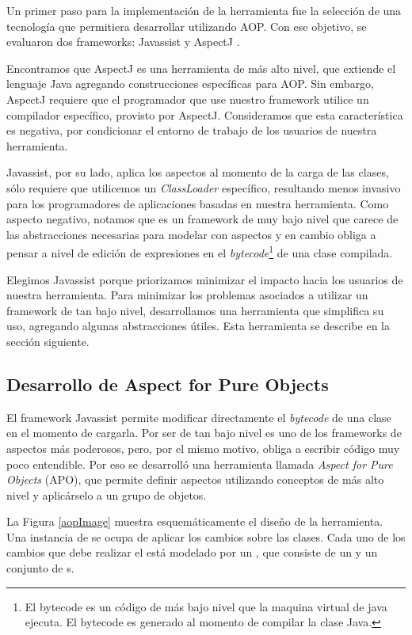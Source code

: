 Un primer paso para la implementación de la herramienta fue la selección de una
tecnología que permitiera desarrollar utilizando AOP.
Con ese objetivo, se evaluaron dos frameworks: Javassist
\cite{chiba00loadtime} y AspectJ \cite{KiczalesHHKPG01}.

\medskip 
Encontramos que AspectJ es una herramienta de más alto nivel, que extiende
el lenguaje Java agregando construcciones específicas para AOP.
Sin embargo, AspectJ requiere que el programador que use nuestro framework
utilice un compilador específico, provisto por AspectJ. 
Consideramos que esta característica es negativa, por condicionar el
entorno de trabajo de los usuarios de nuestra herramienta.

Javassist, por su lado, aplica los aspectos al momento de
la carga de las clases, sólo requiere que utilicemos un \emph{ClassLoader}
específico, resultando menos invasivo para los programadores de aplicaciones
basadas en nuestra herramienta.
Como aspecto negativo, notamos que es un framework de muy bajo nivel que
carece de las abstracciones necesarias para modelar con aspectos y en cambio
obliga a pensar a nivel de edición de expresiones en el \emph{bytecode}\footnote{
El bytecode es un código de más bajo nivel que la maquina virtual de java ejecuta. El bytecode es generado al
momento de compilar la clase Java.} 
	de una clase compilada.
	
	Elegimos Javassist porque priorizamos minimizar el impacto hacia los usuarios
	de nuestra herramienta.
	Para minimizar los problemas asociados a utilizar un framework de tan bajo
	nivel, desarrollamos una herramienta que simplifica su uso, agregando algunas
	abstracciones útiles. Esta herramienta se describe en la sección siguiente.

\subsection{Desarrollo de Aspect for Pure Objects}
El framework Javassist permite modificar directamente el \emph{bytecode} de
una clase en el momento de cargarla.
Por ser de tan bajo nivel es uno de los frameworks de aspectos más poderosos,
pero, por el mismo motivo, obliga a escribir código muy poco entendible.
Por eso se desarrolló una herramienta llamada \emph{Aspect for Pure Objects} (APO), 
que permite definir aspectos utilizando conceptos de más alto nivel y
aplicárselo a un grupo de objetos. 

La Figura \ref{aopImage} muestra esquemáticamente el diseño de la herramienta.
Una instancia de  se ocupa de aplicar los cambios sobre las
clases.
Cada uno de los cambios que debe realizar el  está
modelado por un , que consiste de un  y un conjunto de 
s.

